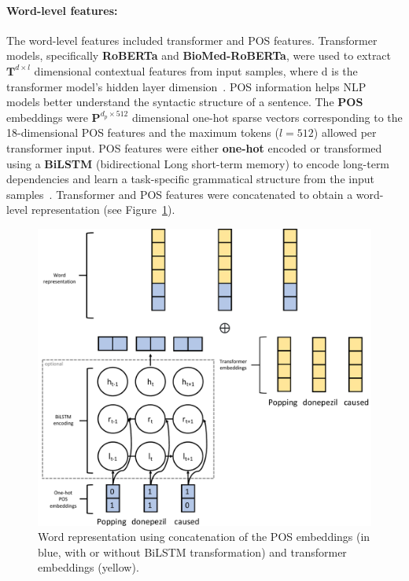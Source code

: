 \documentclass[11pt]{article}
\begin{document}
\paragraph{Word-level features: }
%
The word-level features included transformer and POS features.
Transformer models, specifically \textbf{RoBERTa} and \textbf{BioMed-RoBERTa}, were used to extract $\mathbf{T}^{d \times l}$ dimensional contextual features from input samples, where d is the transformer model's hidden layer dimension~\cite{liu2019roberta,gururangan2020don}.
POS information helps NLP models better understand the syntactic structure of a sentence.
The \textbf{POS} embeddings were $\mathbf{P}^{d_p \times 512}$ dimensional one-hot sparse vectors corresponding to the 18-dimensional POS features and the maximum tokens ($l = 512$) allowed per transformer input. 
POS features were either \textbf{one-hot} encoded or transformed using a \textbf{BiLSTM} (bidirectional Long short-term memory) to encode long-term dependencies and learn a task-specific grammatical structure from the input samples~\cite{hochreiter1997long}.
Transformer and POS features were concatenated to obtain a word-level representation (see Figure~\ref{fig:task2_word}).
\begin{figure}[!htbp]
    \centering
\includegraphics[width=\columnwidth]{figures/word_arch.pdf}
    \caption{Word representation using concatenation of the POS embeddings (in blue, with or without BiLSTM transformation) and transformer embeddings (yellow).}
    \label{fig:task2_word}
\end{figure}
%
%
%
\end{document}
